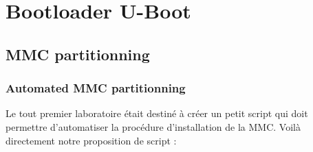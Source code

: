 
\chapter{Bootloader U-Boot} %

\label{Chapitre 2} %


\section{MMC partitionning}

\subsection{Automated MMC partitionning}

Le tout premier laboratoire était destiné à créer un petit script qui doit permettre d'automatiser la procédure d'installation de la MMC. Voilà directement notre proposition de script :

